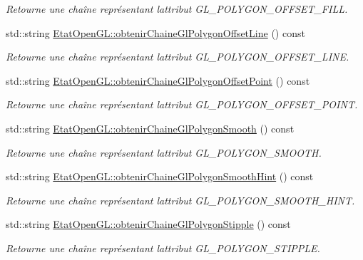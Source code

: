 \begin{DoxyCompactItemize}
\begin{DoxyCompactList}\small\item\em Retourne une chaîne représentant l\textquotesingle{}attribut G\+L\+\_\+\+P\+O\+L\+Y\+G\+O\+N\+\_\+\+O\+F\+F\+S\+E\+T\+\_\+\+F\+I\+L\+L. \end{DoxyCompactList}\item 
std\+::string \hyperlink{group__utilitaire_ga7470a404bbcbef21d1316b3bfd02deb6}{Etat\+Open\+G\+L\+::obtenir\+Chaine\+Gl\+Polygon\+Offset\+Line} () const 
\begin{DoxyCompactList}\small\item\em Retourne une chaîne représentant l\textquotesingle{}attribut G\+L\+\_\+\+P\+O\+L\+Y\+G\+O\+N\+\_\+\+O\+F\+F\+S\+E\+T\+\_\+\+L\+I\+N\+E. \end{DoxyCompactList}\item 
std\+::string \hyperlink{group__utilitaire_ga19543110e1a7115a1ec9a30caaa490fe}{Etat\+Open\+G\+L\+::obtenir\+Chaine\+Gl\+Polygon\+Offset\+Point} () const 
\begin{DoxyCompactList}\small\item\em Retourne une chaîne représentant l\textquotesingle{}attribut G\+L\+\_\+\+P\+O\+L\+Y\+G\+O\+N\+\_\+\+O\+F\+F\+S\+E\+T\+\_\+\+P\+O\+I\+N\+T. \end{DoxyCompactList}\item 
std\+::string \hyperlink{group__utilitaire_gac4627c5f84f92d1e259d756aba7d6068}{Etat\+Open\+G\+L\+::obtenir\+Chaine\+Gl\+Polygon\+Smooth} () const 
\begin{DoxyCompactList}\small\item\em Retourne une chaîne représentant l\textquotesingle{}attribut G\+L\+\_\+\+P\+O\+L\+Y\+G\+O\+N\+\_\+\+S\+M\+O\+O\+T\+H. \end{DoxyCompactList}\item 
std\+::string \hyperlink{group__utilitaire_ga45100a9646aab1c37b538298c55cb0ca}{Etat\+Open\+G\+L\+::obtenir\+Chaine\+Gl\+Polygon\+Smooth\+Hint} () const 
\begin{DoxyCompactList}\small\item\em Retourne une chaîne représentant l\textquotesingle{}attribut G\+L\+\_\+\+P\+O\+L\+Y\+G\+O\+N\+\_\+\+S\+M\+O\+O\+T\+H\+\_\+\+H\+I\+N\+T. \end{DoxyCompactList}\item 
std\+::string \hyperlink{group__utilitaire_ga53fd366a5e9d6eef773c883b1d2914d5}{Etat\+Open\+G\+L\+::obtenir\+Chaine\+Gl\+Polygon\+Stipple} () const 
\begin{DoxyCompactList}\small\item\em Retourne une chaîne représentant l\textquotesingle{}attribut G\+L\+\_\+\+P\+O\+L\+Y\+G\+O\+N\+\_\+\+S\+T\+I\+P\+P\+L\+E. \end{DoxyCompactList}\item 

\end{DoxyCompactItemize}
